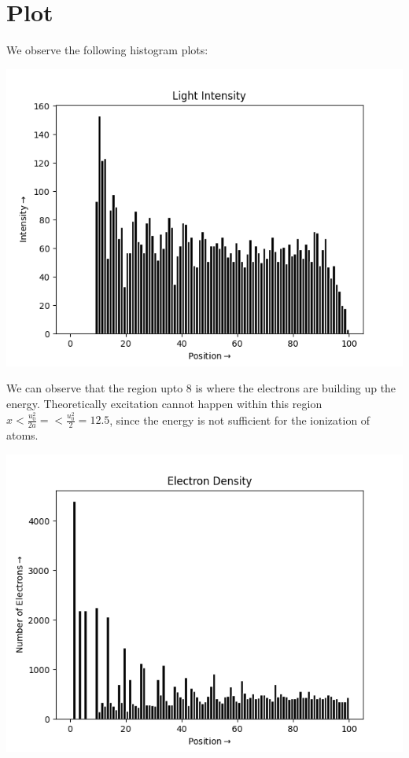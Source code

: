 \documentclass[12pt, a4paper]{report}
\begin{document}
\section*{Plot}
We observe the following histogram plots:

\begin{center}
	\includegraphics[scale=1]{Figure_0} 
	\label{fig:rawdata}
\end{center}
We can observe that the region upto 8 is where the electrons are building up the energy. Theoretically excitation cannot happen within this region $x < \frac{u_0^2}{2a} = < \frac{u_0^2}{2} = 12.5$, since the energy is not sufficient for the ionization of atoms.

\begin{center}
	\includegraphics[scale=0.90]{Figure_1} 
	\label{fig:rawdata}
\end{center}
\end{document}
